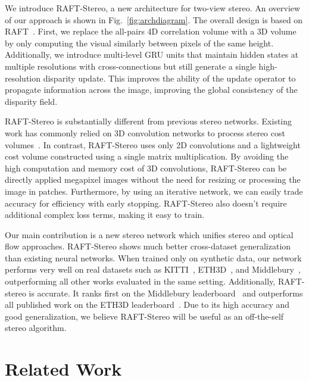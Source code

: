 \documentclass[10pt,twocolumn,letterpaper]{article}
\begin{document}
We introduce RAFT-Stereo, a new architecture for two-view stereo. An overview of our approach is shown in Fig.~\ref{fig:archdiagram}. The overall design is based on RAFT~\cite{teed2020raft}. First, we replace the all-pairs 4D correlation volume with a 3D volume by only computing the visual similarly between pixels of the same height. Additionally, we introduce multi-level GRU units that maintain hidden states at multiple resolutions with cross-connections but still generate a single high-resolution disparity update. This improves the ability of the update operator to propagate information across the image, improving the global consistency of the disparity field.

RAFT-Stereo is substantially different from previous stereo networks. Existing work has commonly relied on 3D convolution networks to process stereo cost volumes~\cite{mvnsnet,psmnet,gcnet,gwcnet,ganet,dsmnet}. In contrast, RAFT-Stereo uses only 2D convolutions and a lightweight cost volume constructed using a single matrix multiplication. By avoiding the high computation and memory cost of 3D convolutions, RAFT-Stereo can be directly applied megapixel images without the need for resizing or processing the image in patches.  Furthermore, by using an iterative network, we can easily trade accuracy for efficiency with early stopping. RAFT-Stereo also doesn't require additional complex loss terms, making it easy to train.

Our main contribution is a new stereo network which unifies stereo and optical flow approaches. RAFT-Stereo shows much better cross-dataset generalization than existing neural networks. When trained only on synthetic data, our network performs very well on real datasets such as KITTI~\cite{kitti}, ETH3D~\cite{eth3d}, and Middlebury~\cite{middlebury}, outperforming all other works evaluated in the same setting. Additionally, RAFT-stereo is accurate. It ranks first on the Middlebury leaderboard~\cite{middlebury} and outperforms all published work on the ETH3D leaderboard~\cite{eth3d}. Due to its high accuracy and good generalization, we believe RAFT-Stereo will be useful as an off-the-self stereo algorithm.











\section{Related Work}
\end{document}
